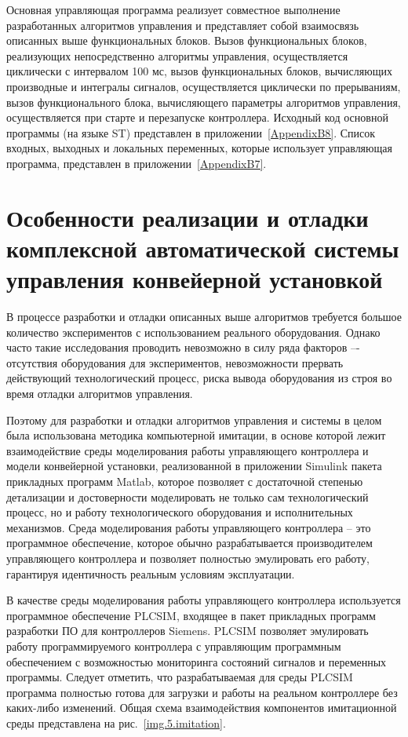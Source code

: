 Основная управляющая программа реализует совместное выполнение разработанных алгоритмов управления и представляет собой взаимосвязь описанных выше функциональных блоков. Вызов функциональных блоков, реализующих непосредственно алгоритмы управления, осуществляется циклически с интервалом 100 мс, вызов функциональных блоков, вычисляющих производные и интегралы сигналов, осуществляется циклически по прерываниям, вызов функционального блока, вычисляющего параметры алгоритмов управления, осуществляется при старте и перезапуске контроллера. Исходный код основной программы (на языке ST) представлен в приложении~\ref{AppendixB8}. Список входных, выходных и локальных переменных, которые использует управляющая программа, представлен в приложении~\ref{AppendixB7}.

\section{Особенности реализации и отладки комплексной автоматической системы управления конвейерной установкой} \label{sect5_4}

В процессе разработки и отладки описанных выше алгоритмов требуется большое количество экспериментов с использованием реального оборудования. Однако часто такие исследования проводить невозможно в силу ряда факторов –- отсутствия оборудования для экспериментов, невозможности прервать действующий технологический процесс, риска вывода оборудования из строя во время отладки алгоритмов управления.

Поэтому для разработки и отладки алгоритмов управления и системы в целом была использована методика компьютерной имитации, в основе которой лежит взаимодействие среды моделирования работы управляющего контроллера и модели конвейерной установки, реализованной в приложении Simulink пакета прикладных программ Matlab, которое позволяет с достаточной степенью детализации и достоверности моделировать не только сам технологический процесс, но и работу технологического оборудования и исполнительных механизмов. Среда моделирования работы управляющего контроллера -- это программное обеспечение, которое обычно разрабатывается производителем управляющего контроллера и позволяет полностью эмулировать его работу, гарантируя идентичность реальным условиям эксплуатации.

В качестве среды моделирования работы управляющего контроллера используется программное обеспечение PLCSIM, входящее в пакет прикладных программ разработки ПО для контроллеров Siemens. PLCSIM позволяет эмулировать работу программируемого контроллера с управляющим  программным обеспечением с возможностью мониторинга состояний сигналов и переменных программы. Следует отметить, что разрабатываемая для среды PLCSIM программа полностью готова для загрузки и работы на реальном контроллере без каких-либо изменений. Общая схема взаимодействия компонентов имитационной среды представлена на рис.~\ref{img.5.imitation}.

